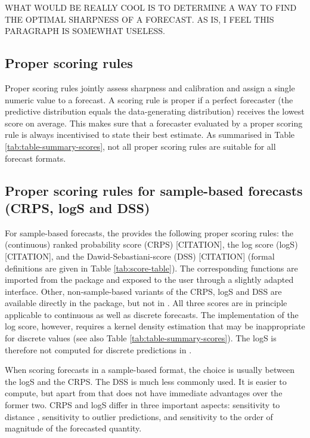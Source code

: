 \documentclass[article,shortnames]{jss}\usepackage[]{graphicx}\usepackage[]{color}
\begin{document}
WHAT WOULD BE REALLY COOL IS TO DETERMINE A WAY TO FIND THE OPTIMAL SHARPNESS OF A FORECAST. AS IS, I FEEL THIS PARAGRAPH IS SOMEWHAT USELESS. 




\subsection{Proper scoring rules}
Proper scoring rules \citep{gneitingStrictlyProperScoring2007} jointly assess sharpness and calibration and assign a single numeric value to a forecast. A scoring rule is proper if a perfect forecaster (the predictive distribution equals the data-generating distribution) receives the lowest score on average. This makes sure that a forecaster evaluated by a proper scoring rule is always incentivised to state their best estimate. As summarised in Table \ref{tab:table-summary-scores}, not all proper scoring rules are suitable for all forecast formats. 

\subsection{Proper scoring rules for sample-based forecasts (CRPS, logS and DSS)}
For sample-based forecasts, the  provides the following proper scoring rules: the (continuous) ranked probability score (CRPS) [CITATION], the log score (logS) [CITATION], and the Dawid-Sebastiani-score (DSS) [CITATION] (formal definitions are given in Table \ref{tab:score-table}). The corresponding functions are imported from the  package and exposed to the user through a slightly adapted interface. Other, non-sample-based variants of the CRPS, logS and DSS are available directly in the  package, but not in . All three scores are in principle applicable to continuous as well as discrete forecasts. The  implementation of the log score, however, requires a kernel density estimation that may be inappropriate for discrete values (see also Table \ref{tab:table-summary-scores}). The logS is therefore not computed for discrete predictions in . 

When scoring forecasts in a sample-based format, the choice is usually between the logS and the CRPS. The DSS is much less commonly used. It is easier to compute, but apart from that does not have immediate advantages over the former two. CRPS and logS differ in three important aspects: sensitivity to distance \cite{winklerScoringRulesEvaluation1996}, sensitivity to outlier predictions, and sensitivity to the order of magnitude of the forecasted quantity. 
\end{document}
